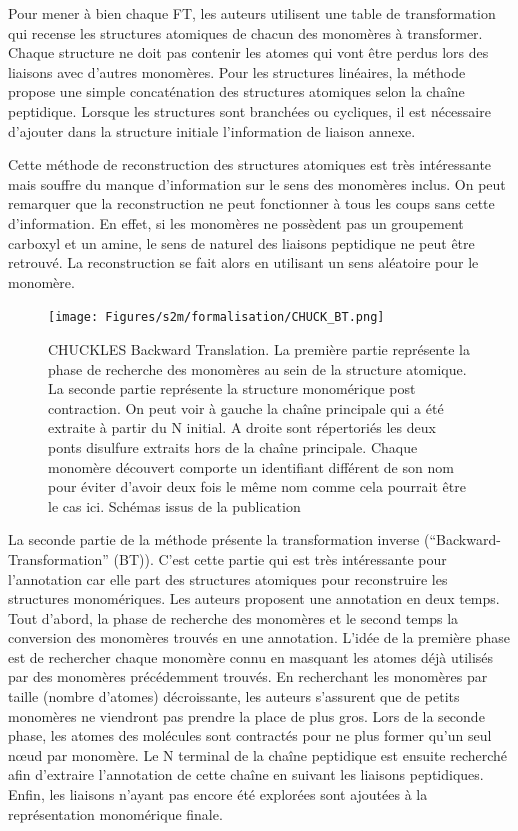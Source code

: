 Pour mener à bien chaque FT, les auteurs utilisent une table de transformation qui recense les structures atomiques de chacun des monomères à transformer.
Chaque structure ne doit pas contenir les atomes qui vont être perdus lors des liaisons avec d'autres monomères.
Pour les structures linéaires, la méthode propose une simple concaténation des structures atomiques selon la chaîne peptidique.
Lorsque les structures sont branchées ou cycliques, il est nécessaire d'ajouter dans la structure initiale l'information de liaison annexe.

Cette méthode de reconstruction des structures atomiques est très intéressante mais souffre du manque d'information sur le sens des monomères inclus.
On peut remarquer que la reconstruction ne peut fonctionner à tous les coups sans cette d'information.
En effet, si les monomères ne possèdent pas un groupement carboxyl et un amine, le sens de naturel des liaisons peptidique ne peut être retrouvé.
La reconstruction se fait alors en utilisant un sens aléatoire pour le monomère.

\begin{figure}[!ht]
  \begin{center}
    \texttt{[image: Figures/s2m/formalisation/CHUCK\_BT.png]}
    \caption{\label{chuck_bt}CHUCKLES Backward Translation.
    La première partie représente la phase de recherche des monomères au sein de la structure atomique.
    La seconde partie représente la structure monomérique post contraction.
    On peut voir à gauche la chaîne principale qui a été extraite à partir du N initial.
    A droite sont répertoriés les deux ponts disulfure extraits hors de la chaîne principale.
    Chaque monomère découvert comporte un identifiant différent de son nom pour éviter d'avoir deux fois le même nom comme cela pourrait être le cas ici.
    Schémas issus de la publication}
  \end{center}
\end{figure}

La seconde partie de la méthode présente la transformation inverse (``Backward-Transformation'' (BT)).
C'est cette partie qui est très intéressante pour l'annotation car elle part des structures atomiques pour reconstruire les structures monomériques.
Les auteurs proposent une annotation en deux temps.
Tout d'abord, la phase de recherche des monomères et le second temps la conversion des monomères trouvés en une annotation.
L'idée de la première phase est de rechercher chaque monomère connu en masquant les atomes déjà utilisés par des monomères précédemment trouvés.
En recherchant les monomères par taille (nombre d'atomes) décroissante, les auteurs s'assurent que de petits monomères ne viendront pas prendre la place de plus gros.
Lors de la seconde phase, les atomes des molécules sont contractés pour ne plus former qu'un seul n\oe{}ud par monomère.
Le N terminal de la chaîne peptidique est ensuite recherché afin d'extraire l'annotation de cette chaîne en suivant les liaisons peptidiques.
Enfin, les liaisons n'ayant pas encore été explorées sont ajoutées à la représentation monomérique finale.

